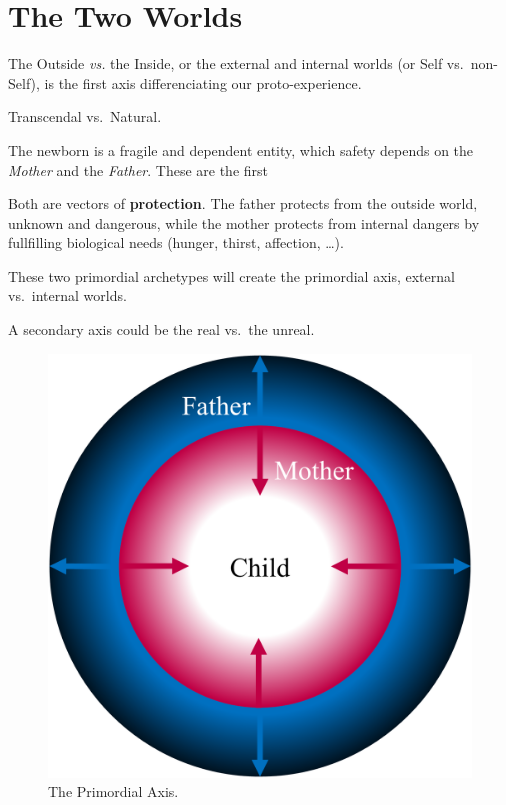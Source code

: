 \documentclass[]{book}
\begin{document}
\hypertarget{the-two-worlds}{%
\section{The Two Worlds}\label{the-two-worlds}}

The Outside \emph{vs.} the Inside, or the external and internal worlds (or Self vs.~non-Self), is the first axis differenciating our proto-experience.

Transcendal vs.~Natural.

The newborn is a fragile and dependent entity, which safety depends on the \emph{Mother} and the \emph{Father}. These are the first

Both are vectors of \textbf{protection}. The father protects from the outside world, unknown and dangerous, while the mother protects from internal dangers by fullfilling biological needs (hunger, thirst, affection, \ldots).

These two primordial archetypes will create the primordial axis, external vs.~internal worlds.

A secondary axis could be the real vs.~the unreal.

\begin{figure}

{\centering \includegraphics[width=\textwidth]{img/protection} 

}

\caption{The Primordial Axis.}\label{fig:unnamed-chunk-5}
\end{figure}
\end{document}

